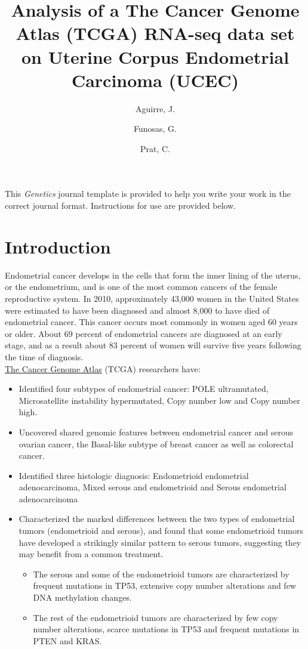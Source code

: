 \documentclass[9pt,twocolumn,twoside]{gsajnl}
\title{Analysis of a The Cancer Genome Atlas (TCGA) RNA-seq data set on Uterine Corpus Endometrial Carcinoma (UCEC)}
\author[$\ast$]{Aguirre, J.}
\author[$\ast$]{Funosas, G.}
\author[$\ast$]{Prat, C.}
\affil[$\ast$]{University Pompeu Fabra}
\begin{document}
\maketitle
\thispagestyle{firststyle}
\marginmark
\firstpagefootnote
{}
\vspace{-11pt}%

\lettrine[lines=2]{\color{color2}T}{}his \textit{Genetics} journal template is provided to help you write your work in the correct journal format. Instructions for use are provided below. 

\section*{Introduction}

Endometrial cancer develops in the cells that form the inner lining of the uterus, or the endometrium, and is one of the most common cancers of the female reproductive system. In 2010, approximately 43,000 women in the United States were estimated to have been diagnosed and almost 8,000 to have died of endometrial cancer. This cancer occurs most commonly in women aged 60 years or older. About 69 percent of endometrial cancers are diagnosed at an early stage, and as a result about 83 percent of women will survive five years following the time of diagnosis.\\
\newline
\href{http://cancergenome.nih.gov/cancersselected/endometrial}{The Cancer Genome Atlas} (TCGA) researchers have:
\begin{itemize}
\item Identified four subtypes of endometrial cancer: POLE ultramutated, Microsatellite instability hypermutated, Copy number low and Copy number high.
\item Uncovered shared genomic features between endometrial cancer and serous ovarian cancer, the Basal-like subtype of breast cancer as well as colorectal cancer.
\item Identified three histologic diagnosis: Endometrioid endometrial adenocarcinoma, Mixed serous and endometrioid and Serous endometrial adenocarcinoma
\item Characterized the marked differences between the two types of endometrial tumors (endometrioid and serous), and found that some endometrioid tumors have developed a strikingly similar pattern to serous tumors, suggesting they may benefit from a common treatment.
\begin{itemize}
\item The serous and some of the endometrioid tumors are characterized by frequent mutations in TP53, extensive copy number alterations and few DNA methylation changes.
\item The rest of the endometrioid tumors are characterized by few copy number alterations, scarce mutations in TP53 and frequent mutations in PTEN and KRAS.
\end{itemize}
\end{itemize}
\end{document}

